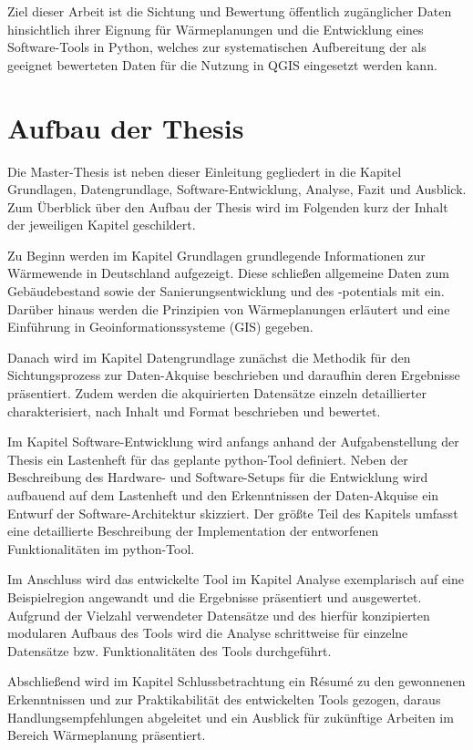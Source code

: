 		Ziel dieser Arbeit ist die Sichtung und Bewertung öffentlich zugänglicher Daten hinsichtlich ihrer Eignung für Wärmeplanungen und die Entwicklung eines Software-Tools in Python, welches zur systematischen Aufbereitung der als geeignet bewerteten Daten für die Nutzung in QGIS eingesetzt werden kann.
				
	\section{Aufbau der Thesis}
		Die Master-Thesis ist neben dieser Einleitung gegliedert in die Kapitel Grundlagen, Datengrundlage, Software-Entwicklung, Analyse, Fazit und Ausblick. Zum Überblick über den Aufbau der Thesis wird im Folgenden kurz der Inhalt der jeweiligen Kapitel geschildert. 
		
		Zu Beginn werden im Kapitel Grundlagen grundlegende Informationen zur Wärmewende in Deutschland aufgezeigt. Diese schließen allgemeine Daten zum Gebäudebestand sowie der Sanierungsentwicklung und des -potentials mit ein. Darüber hinaus werden die Prinzipien von Wärmeplanungen erläutert und eine Einführung in Geoinformationssysteme (GIS) gegeben. 
		
		Danach wird im Kapitel Datengrundlage zunächst die Methodik für den Sichtungsprozess zur Daten-Akquise beschrieben und daraufhin deren Ergebnisse präsentiert. Zudem werden die akquirierten Datensätze einzeln detaillierter charakterisiert, nach Inhalt und Format beschrieben und bewertet. 
		
		Im Kapitel Software-Entwicklung wird anfangs anhand der Aufgabenstellung der Thesis ein Lastenheft für das geplante python-Tool definiert. Neben der Beschreibung des Hardware- und Software-Setups für die Entwicklung wird aufbauend auf dem Lastenheft und den Erkenntnissen der Daten-Akquise ein Entwurf der Software-Architektur skizziert. Der größte Teil des Kapitels umfasst eine detaillierte Beschreibung der Implementation der entworfenen Funktionalitäten im python-Tool. 
		
		Im Anschluss wird das entwickelte Tool im Kapitel Analyse exemplarisch auf eine Beispielregion angewandt und die Ergebnisse präsentiert und ausgewertet. Aufgrund der Vielzahl verwendeter Datensätze und des hierfür konzipierten modularen Aufbaus des Tools wird die Analyse schrittweise für einzelne Datensätze bzw. Funktionalitäten des Tools durchgeführt. 
		
		Abschließend wird im Kapitel Schlussbetrachtung ein Résumé zu den gewonnenen Erkenntnissen und zur Praktikabilität des entwickelten Tools gezogen, daraus Handlungsempfehlungen abgeleitet und ein Ausblick für zukünftige Arbeiten im Bereich Wärmeplanung präsentiert.

		
		
